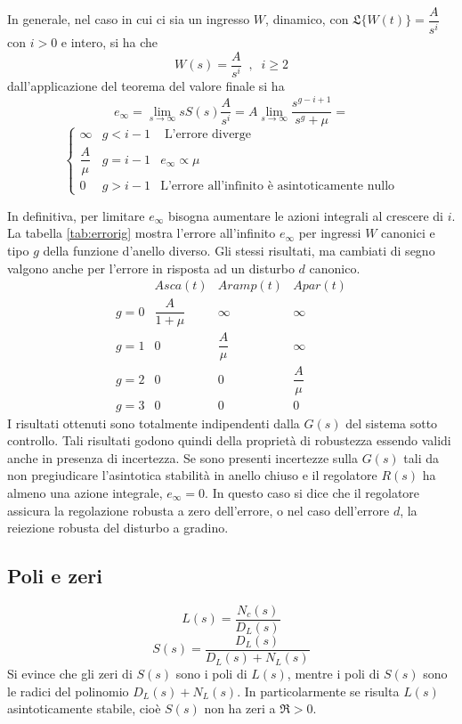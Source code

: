 \documentclass[a4paper]{report}
\begin{document}
In generale, nel caso in cui ci sia un ingresso $W$, dinamico, con
$\mathfrak{L}\{ W(t)\} = \dfrac{A}{s^i}$ con $i > 0$ e intero, si ha
che
\[
W(s) = \dfrac{A}{s^i} \;\;,\;\; i \geq 2
\]
dall'applicazione del teorema del valore finale si ha
\[
e_{\infty} = \lim_{s \to \infty} sS(s) \dfrac{A}{s^i} = A \lim_{s \to
  \infty} \dfrac{s^{g-i+1}}{s^g + \mu} = 
\]
\[
\left \{
\begin{array}{cll}
  \infty & g < i -1 & \textrm{ L'errore diverge}\\
  \dfrac{A}{\mu} & g = i -1 & e_{\infty} \propto \mu\\
  0 & g > i - 1 & \textrm{L'errore all'infinito \`e asintoticamente nullo} 
\end{array}
\right .
\]

In definitiva, per limitare $e_{\infty}$ bisogna aumentare le azioni
integrali al crescere di $i$. La tabella \ref{tab:errorig} mostra
l'errore all'infinito $e_{\infty}$ per ingressi $W$ canonici e tipo
$g$ della funzione d'anello diverso. Gli stessi risultati, ma cambiati
di segno valgono anche per l'errore in risposta ad un disturbo $d$
canonico.
\begin{equation}\label{tab:errorig}
  \begin{array}{cccc}
    & Asca(t) & Aramp(t) & Apar(t)\\
    g = 0 & \dfrac{A}{1 + \mu} & \infty & \infty\\
    g = 1 & 0 & \dfrac{A}{\mu} & \infty \\
    g = 2 & 0 & 0 & \dfrac{A}{\mu}\\
    g = 3 & 0 & 0 & 0
  \end{array}
\end{equation}
I risultati ottenuti sono totalmente indipendenti dalla $G(s)$ del
sistema sotto controllo. Tali risultati godono quindi della
propriet\`a di robustezza essendo validi anche in presenza di
incertezza. Se sono presenti incertezze sulla $G(s)$ tali da non
pregiudicare l'asintotica stabilit\`a in anello chiuso e il regolatore
$R(s)$ ha almeno una azione integrale, $e_{\infty} = 0$. In questo
caso si dice che il regolatore assicura la regolazione robusta a zero
dell'errore, o nel caso dell'errore $d$, la reiezione robusta del
disturbo a gradino.
\subsection{Poli e zeri}
\[
L(s) = \dfrac{N_c(s)}{D_L(s)}
\]
\[
S(s) = \dfrac{D_L(s)}{D_L(s) + N_L(s)}
\]
Si evince che gli zeri di $S(s)$ sono i poli di $L(s)$, mentre i poli
di $S(s)$ sono le radici del polinomio $D_L(s) + N_L(s)$. In
particolarmente se risulta $L(s)$ asintoticamente stabile, cio\`e
$S(s)$ non ha zeri a $\mathfrak{R} > 0$.
\end{document}
